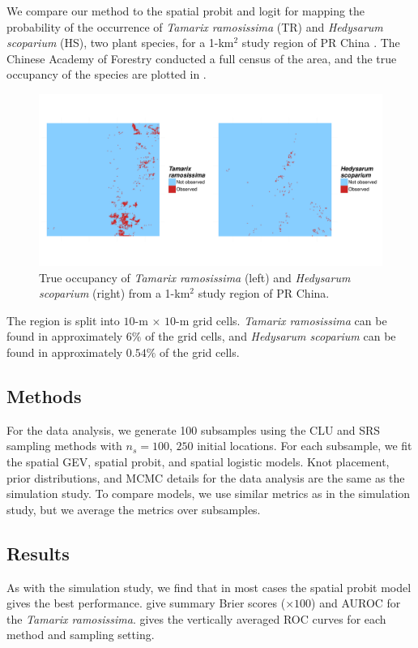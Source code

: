We compare our method to the spatial probit and logit for mapping the probability of the occurrence of \emph{Tamarix ramosissima} (TR) and \emph{Hedysarum scoparium} (HS), two  plant species, for a 1-km$^2$ study region of PR China \citep{Smith2012}.
The Chinese Academy of Forestry conducted a full census of the area, and the true occupancy of the species are plotted in .
\begin{figure}
  \centering
  \includegraphics[width=\linewidth, trim=0 10em 0 10em]{plots/plant-census.pdf}
  \caption{True occupancy of \emph{Tamarix ramosissima} (left) and \emph{Hedysarum scoparium} (right) from a 1-km$^2$ study region of PR China.}
  \label{rbfig:occupancy}
\end{figure}
The region is split into $10$-m $\times$ $10$-m grid cells.
\emph{Tamarix ramosissima} can be found in approximately $6\%$ of the grid cells, and \emph{Hedysarum scoparium} can be found in approximately $0.54\%$ of the grid cells.

\subsection{Methods} \label{rbs:datamethods}
For the data analysis, we generate 100 subsamples using the CLU and SRS sampling methods with $n_s = 100$, $250$ initial locations.
For each subsample, we fit the spatial GEV, spatial probit, and spatial logistic models.
Knot placement, prior distributions, and MCMC details for the data analysis are the same as the simulation study.
To compare models, we use similar metrics as in the simulation study, but we average the metrics over subsamples.

\subsection{Results}\label{rbs:dataresults}
As with the simulation study, we find that in most cases the spatial probit model gives the best performance.
 give summary Brier scores ($\times 100$) and AUROC for the \emph{Tamarix ramosissima}.
 gives the vertically averaged ROC curves for each method and sampling setting.

